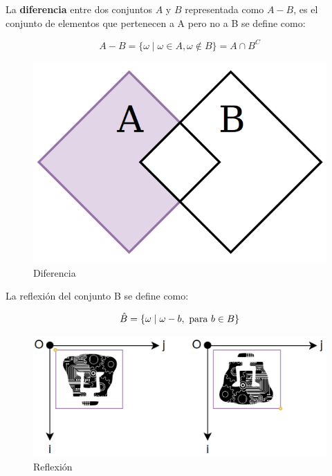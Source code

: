 La \textbf{diferencia} entre dos conjuntos $A$ y $B$ representada como $A-B$, es el conjunto de elementos que pertenecen a A pero no a B se define como:

\begin{equation*}
A - B = \{ \omega \mid \omega \in A, \omega \notin B \} = A \cap B^{C}
\end{equation*}

\begin{figure}[H]
\centering
\includegraphics[scale=0.17]{Figures/Conjuntos_Resta.png}
    \caption{Diferencia}
    \label{fig:Diferencia}
\end{figure}

La reflexión del conjunto B se define como:

\begin{equation*}
\hat{B} = \{ \omega \mid \omega -b, \textup{ para } b \in B \}
\end{equation*}

\begin{figure}[H]
\centering
\includegraphics[scale=0.32]{Figures/Reflexion.png}
    \caption{Reflexión}
    \label{fig:Reflexion}
\end{figure}

